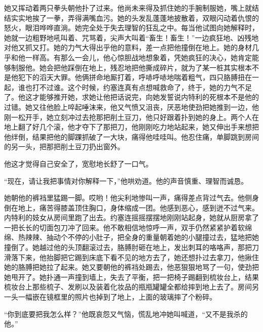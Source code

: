     她又挥动着两只拳头朝他扑了过来。他尚未来得及抓住她的手腕制服她，嘴上就结结实实地挨了一拳，弄得满嘴血污。她的头发乱蓬蓬地披散着，双眼闪动着仇恨的怒火，眼泪哗哗直淌。她完全处于失去理智的狂乱之中。每当他试图向她解释时，她就一边粗野地吼叫着、咒骂着，尖声大叫着“畜生！畜生！”一边疯狂地、凶残地对他又抓又打。她的力气大得出乎他的意料，差一点把他撞倒在地上。她的身材几乎和他一样高。有那么一会儿，他心惊胆战地想象着，凭她疯狂的决心，她肯定能够制服他。她会把他踩倒在地上，残忍地把他撕成碎片，就为了某一桩其实根本不是他犯下的滔天大罪。他俩拼命地厮打着，呼哧呼哧地喘着粗气，四只胳膊扭在一起，谁也打不过谁。这个时候，约塞连真有点想喊救命了，终于，她的力气不足了。他这才能够推开她，求她让他把话说完，向她发誓说内特利的死根本不是他的过错。她又往他脸上啐起唾沫来，他又气愤又沮丧，厌恶地使劲把她推到一边，他刚一松开手，她立刻冲过去抢那把削土豆刀，他只好跟着扑到她的身上。两个人在地上翻了好几个滚，他才夺下了那把刀，他刚刚吃力地站起来，她又伸出手来想把他绊倒，结果把他的脚踝抓破了一大块，痛得他哇哇叫。他忍住痛，单脚跳到房间的另一头，把那把削土豆刀扔出窗外。

    他这才觉得自己安全了，宽慰地长舒了一口气。

    “现在，请让我把事情对你解释一下，”他哄劝道。他的声音慎重、理智而诚恳。

    她朝他的裤裆里猛踢一脚。哎哟！他尖利地惨叫一声，痛得差点背过气去。他侧身倒在地上，痛苦得膝盖顶住胸口，身体缩成一团。他感到恶心，感到迸不过气来。内特利的妓女从房间里跑了出去。约塞连摇摇摆摆地刚刚站起身，她就从厨房拿了一把长长的切面包刀冲了回来。他不敢相信地惊呼一声，双手仍然紧紧护着软绵绵、热辣辣、抽动个不停的小肚子，把全身的重量朝着她的小腿撞过去，猛地把她撞倒了。她越过他的头顶翻滚过去，胳膊肘砸在地上，发出刺耳的咯咯声，那把刀滑落下来，他抬脚把它踢到床底下看不见的地方去了，她还想扑过去拿刀，他揪住她的胳膊把她拉了起来。她又要朝他的裤裆处踢去，他恶狠狠地骂了一句，使劲把她甩开了。她扑通一声撞到墙上，失去了平衡，把一把椅子踢翻到梳妆台上，结果梳妆台上那些梳子、发刷以及装着化妆品的瓶瓶罐罐全都给摔到地上去了。房间另一头一幅嵌在镜框里的照片也掉到了地上，上面的玻璃摔了个粉碎。

    “你到底要把我怎么样？”他既哀怨又气恼，慌乱地冲她叫喊道，“又不是我杀的他。”

